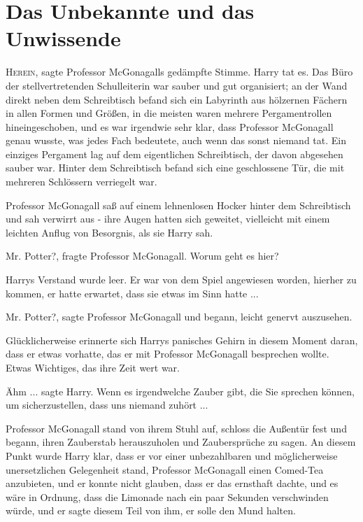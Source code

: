 \chapter{Das Unbekannte und das Unwissende}

\lettrine{\loq H}{erein}\grqq{}, sagte Professor McGonagalls gedämpfte Stimme.
Harry tat es. Das Büro der stellvertretenden Schulleiterin war sauber und gut
organisiert; an der Wand direkt neben dem Schreibtisch befand sich ein Labyrinth
aus hölzernen Fächern in allen Formen und Größen, in die meisten waren mehrere
Pergamentrollen hineingeschoben, und es war irgendwie sehr klar, dass Professor
McGonagall genau wusste, was jedes Fach bedeutete, auch wenn das sonst niemand
tat. Ein einziges Pergament lag auf dem eigentlichen Schreibtisch, der davon
abgesehen sauber war. Hinter dem Schreibtisch befand sich eine geschlossene Tür,
die mit mehreren Schlössern verriegelt war.

Professor McGonagall saß auf einem lehnenlosen Hocker hinter dem Schreibtisch
und sah verwirrt aus - ihre Augen hatten sich geweitet, vielleicht mit einem
leichten Anflug von Besorgnis, als sie Harry sah.

\glqq{}Mr. Potter?\grqq{}, fragte Professor McGonagall. \glqq{}Worum geht es
hier?\grqq{}

Harrys Verstand wurde leer. Er war von dem Spiel angewiesen worden, hierher zu
kommen, er hatte erwartet, dass sie etwas im Sinn hatte ...

\glqq{}Mr. Potter?\grqq{}, sagte Professor McGonagall und begann, leicht genervt
auszusehen.

Glücklicherweise erinnerte sich Harrys panisches Gehirn in diesem Moment daran,
dass er etwas vorhatte, das er mit Professor McGonagall besprechen wollte. Etwas
Wichtiges, das ihre Zeit wert war.

\glqq{}Ähm ...\grqq{} sagte Harry. \glqq{}Wenn es irgendwelche Zauber gibt, die
Sie sprechen können, um sicherzustellen, dass uns niemand zuhört ...\grqq{}

Professor McGonagall stand von ihrem Stuhl auf, schloss die Außentür fest und
begann, ihren Zauberstab herauszuholen und Zaubersprüche zu sagen. An diesem
Punkt wurde Harry klar, dass er vor einer unbezahlbaren und möglicherweise
unersetzlichen Gelegenheit stand, Professor McGonagall einen Comed-Tea
anzubieten, und er konnte nicht glauben, dass er das ernsthaft dachte, und es
wäre in Ordnung, dass die Limonade nach ein paar Sekunden verschwinden würde,
und er sagte diesem Teil von ihm, er solle den Mund halten.


